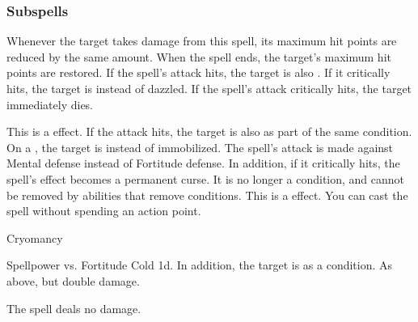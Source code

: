 \subsubsection{Subspells}
Whenever the target takes damage from this spell, its maximum hit points are reduced by the same amount.
When the spell ends, the target's maximum hit points are restored.
If the spell's attack hits, the target is also \dazzled. If it critically hits, the target is \blinded instead of dazzled.
If the spell's attack critically hits, the target immediately dies.
\par
This is a  effect.
If the attack hits, the target is also  as part of the same condition.
On a , the target is  instead of immobilized.
The spell's attack is made against Mental defense instead of Fortitude defense.
In addition, if it critically hits, the spell's effect becomes a permanent curse.
It is no longer a condition, and cannot be removed by abilities that remove conditions.
This is a  effect.
You can cast the spell without spending an action point.
\begin{spellsection}{Cryomancy}
\begin{spellheader}
\end{spellheader}
\begin{spellcontent}
\begin{spelltargetinginfo}
\end{spelltargetinginfo}
\begin{spelleffects}
\begin{spellattack}{Spellpower vs. Fortitude}
\spellsuccess
Cold  \minus1d.
In addition, the target is \fatigued as a condition.
\spellcritical As above, but double damage.
\end{spellattack}
\end{spelleffects}
\end{spellcontent}
\begin{spellfooter}
\end{spellfooter}
\begin{spellsubcontent}
\begin{spellcantrip}
The spell deals no damage.
\end{spellcantrip}
\end{spellsubcontent}
\end{spellsection}
